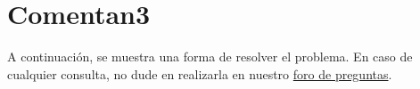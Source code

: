 \section{Comentan3}

A continuación, se muestra una forma de resolver el problema. En caso de cualquier consulta, no dude en realizarla en nuestro \href{https://aula.usm.cl/mod/forum/view.php?id=2654494}{foro de preguntas}.


